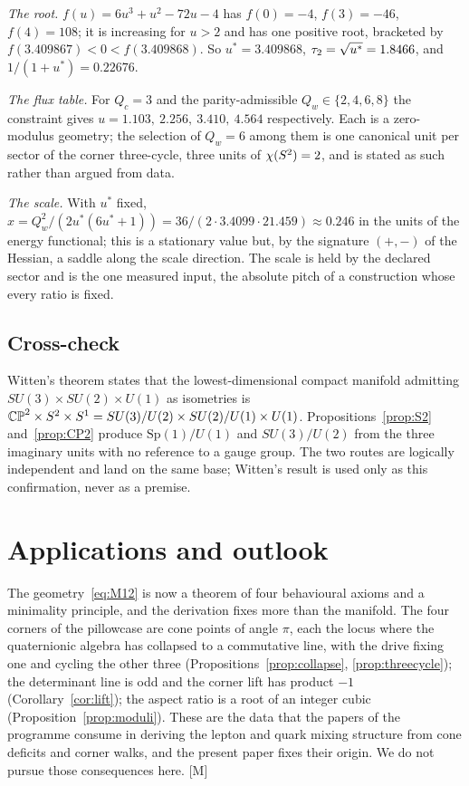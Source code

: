 \documentclass[11pt,a4paper]{article}
\theoremstyle{plain}
\theoremstyle{definition}
\theoremstyle{remark}
\newcommand{\rigM}{[\textup{M}]}
\begin{document}
\emph{The root.} $f(u)=6u^{3}+u^{2}-72u-4$ has $f(0)=-4$, $f(3)=-46$, $f(4)=108$; it is increasing for $u>2$ and has one positive root, bracketed by $f(3.409867)<0<f(3.409868)$. So $u^{*}=3.409868$, $\tau_2=\sqrt{u^{*}}=1.8466$, and $1/(1+u^{*})=0.22676$.

\emph{The flux table.} For $Q_{c}=3$ and the parity-admissible $Q_{w}\in\{2,4,6,8\}$ the constraint gives $u=1.103,\ 2.256,\ 3.410,\ 4.564$ respectively. Each is a zero-modulus geometry; the selection of $Q_{w}=6$ among them is one canonical unit per sector of the corner three-cycle, three units of $\chi(S^2)=2$, and is stated as such rather than argued from data.

\emph{The scale.} With $u^{*}$ fixed, $x=Q_{w}^{2}/(2u^{*}(6u^{*}+1))=36/(2\cdot3.4099\cdot21.459)\approx0.246$ in the units of the energy functional; this is a stationary value but, by the signature $(+,-)$ of the Hessian, a saddle along the scale direction. The scale is held by the declared sector and is the one measured input, the absolute pitch of a construction whose every ratio is fixed.

\subsection{Cross-check}

Witten's theorem \cite{Witten1981} states that the lowest-dimensional compact manifold admitting $SU(3)\times SU(2)\times U(1)$ as isometries is $\mathbb{CP}^2\times S^2\times S^{1}=SU(3)/U(2)\times SU(2)/U(1)\times U(1)$. Propositions~\ref{prop:S2} and~\ref{prop:CP2} produce $\mathrm{Sp}(1)/U(1)$ and $SU(3)/U(2)$ from the three imaginary units with no reference to a gauge group. The two routes are logically independent and land on the same base; Witten's result is used only as this confirmation, never as a premise.

\section{Applications and outlook}\label{sec:outlook}

The geometry~\eqref{eq:M12} is now a theorem of four behavioural axioms and a minimality principle, and the derivation fixes more than the manifold. The four corners of the pillowcase are cone points of angle $\pi$, each the locus where the quaternionic algebra has collapsed to a commutative line, with the drive fixing one and cycling the other three (Propositions~\ref{prop:collapse}, \ref{prop:threecycle}); the determinant line is odd and the corner lift has product $-1$ (Corollary~\ref{cor:lift}); the aspect ratio is a root of an integer cubic (Proposition~\ref{prop:moduli}). These are the data that the papers of the programme consume in deriving the lepton and quark mixing structure from cone deficits and corner walks, and the present paper fixes their origin. We do not pursue those consequences here. \rigM
\end{document}
